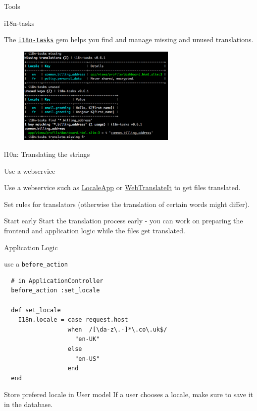 \documentclass{beamer}
\begin{document}
\begin{frame}[fragile]{Tools}
\begin{block}{i18n-tasks}

The \href{https://github.com/globalize/globalize}{\lstinline{i18n-tasks}} gem helps you find and manage missing and unused translations.

\begin{figure}[ht!]
\centering
\includegraphics[width=77mm]{i18ntasks.png}
\end{figure}

\end{block}
\end{frame}

\begin{frame}[fragile]{l10n: Translating the strings}
\begin{block}{Use a webservice}

Use a webservice such as \href{http://localeapp.com}{LocaleApp} or \href{http://webtranslateit.com}{WebTranslateIt} to get files translated.

Set rules for translators (otherwise the translation of certain words might differ).

\end{block}

\begin{block}{Start early}
Start the translation process early - you can work on preparing the frontend and application logic while the files get translated.
\end{block}

\end{frame}

\begin{frame}[fragile]{Application Logic}
\begin{block}{use a \lstinline{before_action}}

\begin{lstlisting}
  # in ApplicationController
  before_action :set_locale

  def set_locale
    I18n.locale = case request.host
                  when  /[\da-z\.-]*\.co\.uk$/
                    "en-UK"
                  else
                    "en-US"
                  end
  end
\end{lstlisting}

\end{block}

\begin{block}{Store prefered locale in User model}
If a user chooses a locale, make sure to save it in the database.
\end{block}

\end{frame}
\end{document}
